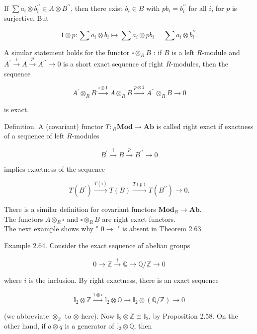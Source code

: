 \documentclass[10pt, letterpaper]{article}
\begin{document}
If $\sum a_{i} \otimes b_{i}^{\prime \prime} \in A \otimes B^{\prime \prime}$, then there exist $b_{i} \in B$ with $p b_{i}=b_{i}^{\prime \prime}$ for all $i$, for $p$ is surjective. But

$$
1 \otimes p: \sum a_{i} \otimes b_{i} \mapsto \sum a_{i} \otimes p b_{i}=\sum a_{i} \otimes b_{i}^{\prime \prime} .
$$

A similar statement holds for the functor $\square \otimes_{R} B$ : if $B$ is a left $R$-module and $A^{\prime} \xrightarrow{i} A \xrightarrow{p} A^{\prime \prime} \rightarrow 0$ is a short exact sequence of right $R$-modules, then the sequence

$$
A^{\prime} \otimes_{R} B \xrightarrow{i \otimes 1} A \otimes_{R} B \xrightarrow{p \otimes 1} A^{\prime \prime} \otimes_{R} B \rightarrow 0
$$

is exact.

Definition. A (covariant) functor $T:{ }_{R} \mathbf{M o d} \rightarrow \mathbf{A b}$ is called right exact if exactness of a sequence of left $R$-modules

$$
B^{\prime} \xrightarrow{i} B \xrightarrow{p} B^{\prime \prime} \rightarrow 0
$$

implies exactness of the sequence

$$
T\left(B^{\prime}\right) \xrightarrow{T(i)} T(B) \xrightarrow{T(p)} T\left(B^{\prime \prime}\right) \rightarrow 0 .
$$

There is a similar definition for covariant functors $\mathbf{M o d}_{R} \rightarrow \mathbf{A b}$.\\
The functors $A \otimes_{R} \square$ and $\square \otimes_{R} B$ are right exact functors.\\
The next example shows why " $0 \rightarrow$ " is absent in Theorem 2.63.

Example 2.64. Consider the exact sequence of abelian groups

$$
0 \rightarrow \mathbb{Z} \xrightarrow{i} \mathbb{Q} \rightarrow \mathbb{Q} / \mathbb{Z} \rightarrow 0
$$

where $i$ is the inclusion. By right exactness, there is an exact sequence

$$
\mathbb{I}_{2} \otimes \mathbb{Z} \xrightarrow{1 \otimes i} \mathbb{I}_{2} \otimes \mathbb{Q} \rightarrow \mathbb{I}_{2} \otimes(\mathbb{Q} / \mathbb{Z}) \rightarrow 0
$$

(we abbreviate $\otimes_{\mathbb{Z}}$ to $\otimes$ here). Now $\mathbb{I}_{2} \otimes \mathbb{Z} \cong \mathbb{I}_{2}$, by Proposition 2.58. On the other hand, if $a \otimes q$ is a generator of $\mathbb{I}_{2} \otimes \mathbb{Q}$, then
\end{document}

